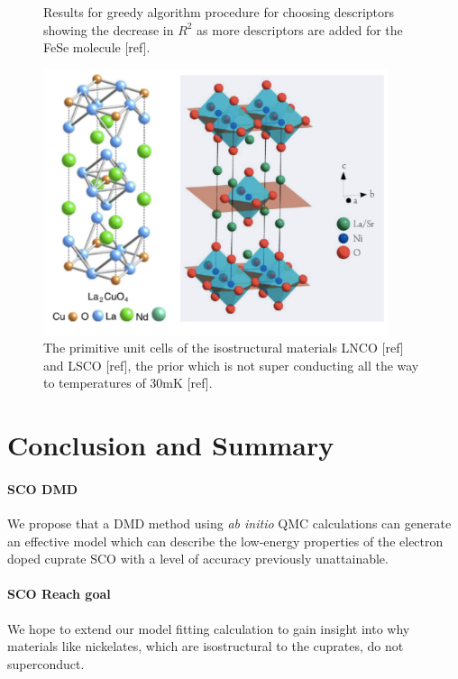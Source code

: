 \documentclass{article}
\begin{document}
\begin{figure}[H]
\centering
\caption{\label{fig6} Results for greedy algorithm procedure for choosing descriptors showing the decrease in $R^2$ as more descriptors are added for the FeSe molecule [ref].}
\end{figure}

\begin{figure}[H]
\centering
\includegraphics[width=0.9\textwidth]{Figures/P2-Ni_Cu.pdf}
\caption{\label{fig7} The primitive unit cells of the isostructural materials LNCO [ref] and LSCO [ref], the prior which is not super conducting all the way to temperatures of 30mK [ref].}
\end{figure}
\pagebreak

\section{Conclusion and Summary}
\paragraph{SCO DMD} We propose that a DMD method using \textit{ab initio} QMC calculations can generate an effective model which can describe the low-energy properties of the electron doped cuprate SCO with a level of accuracy previously unattainable.

\paragraph{SCO Reach goal} We hope to extend our model fitting calculation to gain insight into why materials like nickelates, which are isostructural to the cuprates, do not superconduct. 
\end{document}
